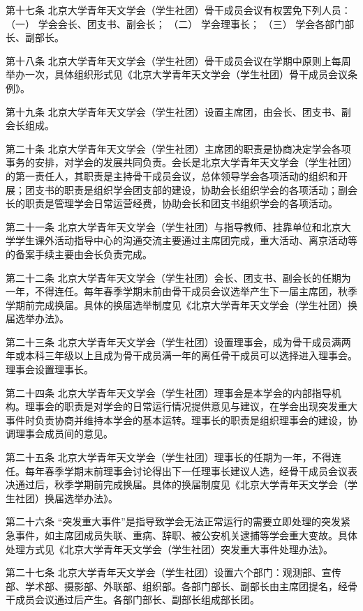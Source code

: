 第十七条  北京大学青年天文学会（学生社团）骨干成员会议有权罢免下列人员：
（一）  学会会长、团支书、副会长；
（二）  学会理事长；
（三）  学会各部门部长、副部长。

第十八条  北京大学青年天文学会（学生社团）骨干成员会议在学期中原则上每周举办一次，具体组织形式见《北京大学青年天文学会（学生社团）骨干成员会议条例》。

第十九条  北京大学青年天文学会（学生社团）设置主席团，由会长、团支书、副会长组成。

第二十条  北京大学青年天文学会（学生社团）主席团的职责是协商决定学会各项事务的安排，对学会的发展共同负责。会长是北京大学青年天文学会（学生社团）的第一责任人，其职责是主持骨干成员会议，总体领导学会各项活动的组织和开展；团支书的职责是组织学会团支部的建设，协助会长组织学会的各项活动；副会长的职责是管理学会日常运营经费，协助会长和团支书组织学会的各项活动。

第二十一条  北京大学青年天文学会（学生社团）与指导教师、挂靠单位和北京大学学生课外活动指导中心的沟通交流主要通过主席团完成，重大活动、离京活动等的备案手续主要由会长负责完成。

第二十二条  北京大学青年天文学会（学生社团）会长、团支书、副会长的任期为一年，不得连任。每年春季学期末前由骨干成员会议选举产生下一届主席团，秋季学期前完成换届。具体的换届选举制度见《北京大学青年天文学会（学生社团）换届选举办法》。

第二十三条  北京大学青年天文学会（学生社团）设置理事会，成为骨干成员满两年或本科三年级以上且成为骨干成员满一年的离任骨干成员可以选择进入理事会。理事会设置理事长。

第二十四条  北京大学青年天文学会（学生社团）理事会是本学会的内部指导机构。理事会的职责是对学会的日常运行情况提供意见与建议，在学会出现突发重大事件时负责协商并维持本学会的基本运转。理事长的职责是组织理事会的建设，协调理事会成员间的意见。

第二十五条  北京大学青年天文学会（学生社团）理事长的任期为一年，不得连任。每年春季学期末前理事会讨论得出下一任理事长建议人选，经骨干成员会议表决通过后，秋季学期前完成换届。具体的换届制度见《北京大学青年天文学会（学生社团）换届选举办法》。

第二十六条  “突发重大事件”是指导致学会无法正常运行的需要立即处理的突发紧急事件，如主席团成员失联、重病、辞职、被公安机关逮捕等学会重大变故。具体处理方式见《北京大学青年天文学会（学生社团）突发重大事件处理办法》。

第二十七条  北京大学青年天文学会（学生社团）设置六个部门：观测部、宣传部、学术部、摄影部、外联部、组织部。各部门部长、副部长由主席团提名，经骨干成员会议通过后产生。各部门部长、副部长组成部长团。

